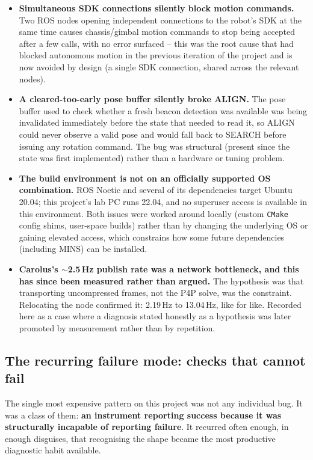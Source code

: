 \documentclass[11pt]{article}
\begin{document}
\begin{itemize}
  \item \textbf{Simultaneous SDK connections silently block motion
  commands.} Two ROS nodes opening independent connections to the robot's
  SDK at the same time causes chassis/gimbal motion commands to stop being
  accepted after a few calls, with no error surfaced -- this was the root
  cause that had blocked autonomous motion in the previous iteration of the
  project and is now avoided by design (a single SDK connection, shared
  across the relevant nodes).
  \item \textbf{A cleared-too-early pose buffer silently broke ALIGN.} The
  pose buffer used to check whether a fresh beacon detection was available
  was being invalidated immediately before the state that needed to read it,
  so ALIGN could never observe a valid pose and would fall back to SEARCH
  before issuing any rotation command. The bug was structural (present since
  the state was first implemented) rather than a hardware or tuning problem.
  \item \textbf{The build environment is not on an officially supported OS
  combination.} ROS Noetic and several of its dependencies target Ubuntu
  20.04; this project's lab PC runs 22.04, and no superuser access is
  available in this environment. Both issues were worked around locally
  (custom \texttt{CMake} config shims, user-space builds) rather than by
  changing the underlying OS or gaining elevated access, which constrains
  how some future dependencies (including MINS) can be installed.
  \item \textbf{Carolus's $\sim$2.5\,Hz publish rate was a network
  bottleneck, and this has since been measured rather than argued.} The
  hypothesis was that transporting uncompressed frames, not the P4P solve,
  was the constraint. Relocating the node confirmed it: 2.19\,Hz to
  13.04\,Hz, like for like. Recorded here as a case where a diagnosis stated
  honestly as a hypothesis was later promoted by measurement rather than by
  repetition.
\end{itemize}

\subsection{The recurring failure mode: checks that cannot fail}

The single most expensive pattern on this project was not any individual
bug. It was a class of them: \textbf{an instrument reporting success because
it was structurally incapable of reporting failure}. It recurred often
enough, in enough disguises, that recognising the shape became the most
productive diagnostic habit available.
\end{document}
